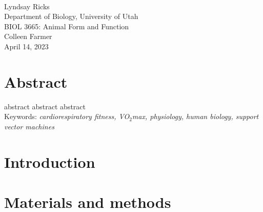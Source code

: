 \documentclass{article}
\begin{document}
\begin{titlepage}
	\centering
	\vspace*{0.2\textheight}
	\textbf{}\\
	Lyndsay Ricks\\
	Department of Biology, University of Utah\\
	BIOL 3665: Animal Form and Function\\
	Colleen Farmer\\
	April 14, 2023
\end{titlepage}
\section{Abstract}

{\parindent0pt abstract abstract abstract} \\

{\parindent0pt Keywords: \emph{cardiorespiratory fitness, VO$_2$max, physiology, human biology, support vector machines}}

\pagebreak

\section{Introduction}

\section{Materials and methods}
\end{document}
